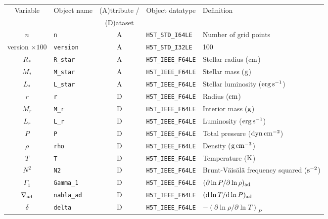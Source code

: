 \documentclass{article}
\newcommand{\diff}{\ensuremath{{\rm d}}}
\newcommand{\Rstar}{\ensuremath{R_{\ast}}}
\newcommand{\Mstar}{\ensuremath{M_{\ast}}}
\newcommand{\Lstar}{\ensuremath{L_{\ast}}}
\newcommand{\cm}{\ensuremath{{\rm cm}}}
\newcommand{\gram}{\ensuremath{{\rm g}}}
\newcommand{\second}{\ensuremath{{\rm s}}}
\newcommand{\dyne}{\ensuremath{{\rm dyn}}}
\newcommand{\erg}{\ensuremath{{\rm erg}}}
\newcommand{\kelvin}{\ensuremath{{\rm K}}}
\begin{document}
\begin{table}[h!]
\begin{tabular}{|c|l|c|l|l|} \hline
Variable & Object name & (A)ttribute / & Object datatype & Definition \\
&             & (D)ataset     &                 &            \\ \hline
$n$               & \texttt{n}            & A &\texttt{H5T\_STD\_I64LE}  & Number of grid points \\ 
version $\times 100$ & \texttt{version}   & A & \texttt{H5T\_STD\_I32LE}  & 100 \\
\Rstar            & \texttt{R\_star}      & A & \texttt{H5T\_IEEE\_F64LE} & Stellar radius ($\cm$) \\
\Mstar            & \texttt{M\_star}      & A & \texttt{H5T\_IEEE\_F64LE} & Stellar mass ($\gram$) \\
\Lstar            & \texttt{L\_star}      & A & \texttt{H5T\_IEEE\_F64LE} & Stellar luminosity ($\erg\,\second^{-1}$) \\
$r$               & \texttt{r}            & D & \texttt{H5T\_IEEE\_F64LE} & Radius ($\cm$) \\
$M_{r}$           & \texttt{M\_r}            & D & \texttt{H5T\_IEEE\_F64LE} & Interior mass ($\gram$) \\
$L_{r}$           & \texttt{L\_r}         & D & \texttt{H5T\_IEEE\_F64LE} & Luminosity ($\erg\,\second^{-1}$) \\
$P$               & \texttt{P}            & D & \texttt{H5T\_IEEE\_F64LE} & Total pressure ($\dyne\,\cm^{-2}$) \\
$\rho$            & \texttt{rho}          & D & \texttt{H5T\_IEEE\_F64LE} & Density ($\gram\,\cm^{-3}$) \\
$T$               & \texttt{T}            & D & \texttt{H5T\_IEEE\_F64LE} & Temperature ($\kelvin$) \\
$N^{2}$           & \texttt{N2}           & D & \texttt{H5T\_IEEE\_F64LE} & Brunt-V\"ais\"al\"a frequency squared ($\second^{-2}$) \\
$\Gamma_{1}$      & \texttt{Gamma\_1}      & D & \texttt{H5T\_IEEE\_F64LE} & $(\partial \ln P/\partial \ln \rho)_{\rm ad}$ \\
$\nabla_{\rm ad}$  & \texttt{nabla\_ad}      & D & \texttt{H5T\_IEEE\_F64LE} & $(\diff \ln T/\diff \ln P)_{\rm ad}$ \\
$\delta$          & \texttt{delta}            & D & \texttt{H5T\_IEEE\_F64LE} & $-(\partial \ln \rho/\partial \ln T)_{P}$  \\

\end{tabular}
\end{table}
\end{document}
